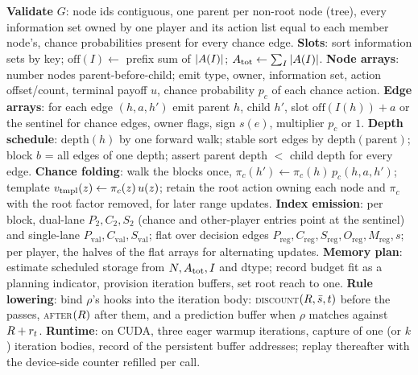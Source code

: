 \begin{algorithm}[t]
\caption{\textsc{Compile}(GameSpec $G$, rule $\rho$, device $d$) $\to$ solver}
\label{alg:compile}
\begin{algorithmic}[1]
\State \textbf{Validate} $G$: node ids contiguous, one parent per non-root node
(tree), every information set owned by one player and its action list equal to
each member node's, chance probabilities present for every chance edge.
\State \textbf{Slots}: sort information sets by key; $\mathrm{off}(I) \gets$
prefix sum of $|A(I)|$; $A_{\mathrm{tot}} \gets \sum_I |A(I)|$.
\State \textbf{Node arrays}: number nodes parent-before-child; emit type, owner,
information set, action offset/count, terminal payoff $u$, chance probability
$p_c$ of each chance action.
\State \textbf{Edge arrays}: for each edge $(h,a,h')$ emit parent $h$, child
$h'$, slot $\mathrm{off}(I(h)) + a$ or the sentinel for chance edges, owner
flags, sign $s(e)$, multiplier $p_c$ or $1$. 
\State \textbf{Depth schedule}: $\mathrm{depth}(h)$ by one forward walk; stable
sort edges by $\mathrm{depth}(\text{parent})$; block $b$ = all edges of one
depth; assert parent depth $<$ child depth for every edge.
\State \textbf{Chance folding}: walk the blocks once, $\pi_c(h') \gets
\pi_c(h)\, p_c(h,a,h')$; template $v_{\mathrm{tmpl}}(z) \gets \pi_c(z)\,u(z)$;
retain the root action owning each node and $\pi_c$ with the root factor
removed, for later range updates. 
\State \textbf{Index emission}: per block, dual-lane $P_2, C_2, S_2$ (chance and
other-player entries point at the sentinel) and single-lane $P_{\mathrm{val}},
C_{\mathrm{val}}, S_{\mathrm{val}}$; flat over decision edges $P_{\mathrm{reg}},
C_{\mathrm{reg}}, S_{\mathrm{reg}}, O_{\mathrm{reg}}, M_{\mathrm{reg}}, s$; per
player, the halves of the flat arrays for alternating updates.
\State \textbf{Memory plan}: estimate scheduled storage from
$N, A_{\mathrm{tot}}, I$ and dtype; record budget fit as a
planning indicator, provision iteration buffers, set root reach to one.
\State \textbf{Rule lowering}: bind $\rho$'s hooks into the iteration body:
\textsc{discount}$(R,\bar{s},t)$ before the passes,
\textsc{after}$(R)$ after them, and a prediction buffer when $\rho$
matches against $R + r_t$. 
\State \textbf{Runtime}: on CUDA, three eager warmup iterations, capture of one
(or $k$) iteration bodies, record of the persistent buffer addresses; replay
thereafter with the device-side counter refilled per call.
\end{algorithmic}
\end{algorithm}

